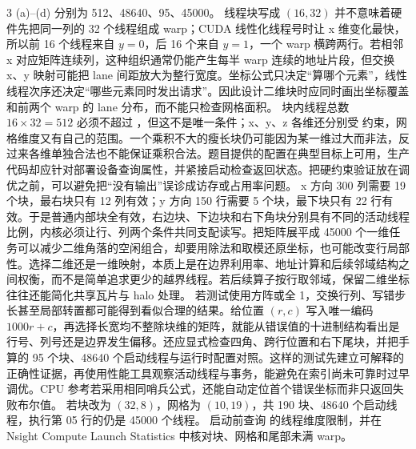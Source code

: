 \begin{solutionexercise}{3}
\conclusionheading (a)--(d) 分别为 512、48640、95、45000。
\discussionheading
{}
线程块写成 $(16,32)$ 并不意味着硬件先把同一列的 32 个线程组成 warp；CUDA 线性化线程号时让 x 维变化最快，所以前 16 个线程来自 $y=0$，后 16 个来自 $y=1$，一个 warp 横跨两行。若相邻 x 对应矩阵连续列，这种组织通常仍能产生每半 warp 连续的地址片段，但交换 x、y 映射可能把 lane 间距放大为整行宽度。坐标公式只决定“算哪个元素”，线性线程次序还决定“哪些元素同时发出请求”。因此设计二维块时应同时画出坐标覆盖和前两个 warp 的 lane 分布，而不能只检查网格面积。
块内线程总数 $16\times32=512$ 必须不超过 ，但这不是唯一条件；x、y、z 各维还分别受  约束，网格维度又有自己的范围。一个乘积不大的瘦长块仍可能因为某一维过大而非法，反过来各维单独合法也不能保证乘积合法。题目提供的配置在典型目标上可用，生产代码却应针对部署设备查询属性，并紧接启动检查返回状态。把硬约束验证放在调优之前，可以避免把“没有输出”误诊成访存或占用率问题。
x 方向 300 列需要 19 个块，最右块只有 12 列有效；y 方向 150 行需要 5 个块，最下块只有 22 行有效。于是普通内部块全有效，右边块、下边块和右下角块分别具有不同的活动线程比例，内核必须让行、列两个条件共同支配读写。把矩阵展平成 45000 个一维任务可以减少二维角落的空闲组合，却要用除法和取模还原坐标，也可能改变行局部性。选择二维还是一维映射，本质上是在边界利用率、地址计算和后续邻域结构之间权衡，而不是简单追求更少的越界线程。若后续算子按行取邻域，保留二维坐标往往还能简化共享瓦片与 halo 处理。
若测试使用方阵或全 1，交换行列、写错步长甚至局部转置都可能得到看似合理的结果。给位置 $(r,c)$ 写入唯一编码 $1000r+c$，再选择长宽均不整除块维的矩阵，就能从错误值的十进制结构看出是行号、列号还是边界发生偏移。还应显式检查四角、跨行位置和右下尾块，并把手算的 95 个块、48640 个启动线程与运行时配置对照。这样的测试先建立可解释的正确性证据，再使用性能工具观察活动线程与事务，能避免在索引尚未可靠时过早调优。CPU 参考若采用相同哨兵公式，还能自动定位首个错误坐标而非只返回失败布尔值。
\variantheading 若块改为 $(32,8)$，网格为 $(10,19)$，共 190 块、48640 个启动线程，执行第 05 行的仍是 45000 个线程。
\practiceheading 启动前查询  的线程维度限制，并在 Nsight Compute Launch Statistics 中核对块、网格和尾部未满 warp。
\end{solutionexercise}

